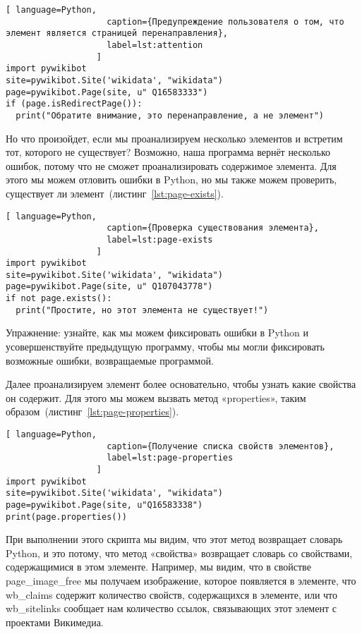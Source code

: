 \begin{lstlisting}[ language=Python,
                    caption={Предупреждение пользователя о том, что элемент является страницей перенаправления},
                    label=lst:attention
                  ]
import pywikibot
site=pywikibot.Site('wikidata', "wikidata")
page=pywikibot.Page(site, u" Q16583333")
if (page.isRedirectPage()):
  print("Обратите внимание, это перенаправление, а не элемент")
\end{lstlisting}

Но что произойдет, если мы проанализируем несколько элементов и встретим тот, которого не существует? Возможно, наша программа вернёт несколько ошибок, потому что не сможет проанализировать содержимое элемента. Для этого мы можем отловить ошибки в Python, но мы также можем проверить, существует ли элемент~(листинг~\ref{lst:page-exists}).

\begin{lstlisting}[ language=Python,
                    caption={Проверка существования элемента},
                    label=lst:page-exists
                  ]
import pywikibot
site=pywikibot.Site('wikidata', "wikidata")
page=pywikibot.Page(site, u" Q107043778")
if not page.exists():
  print("Простите, но этот элемента не существует!")
\end{lstlisting}

Упражнение: узнайте, как мы можем фиксировать ошибки в Python и усовершенствуйте предыдущую программу, чтобы мы могли фиксировать возможные ошибки, возвращаемые программой.

Далее проанализируем элемент более основательно, чтобы узнать какие свойства он содержит. Для этого мы можем вызвать метод «properties», таким образом~(листинг~\ref{lst:page-properties}).

\begin{lstlisting}[ language=Python,
                    caption={Получение списка свойств элементов},
                    label=lst:page-properties
                  ]
import pywikibot
site=pywikibot.Site('wikidata', "wikidata")
page=pywikibot.Page(site, u"Q16583338")
print(page.properties())
\end{lstlisting}

При выполнении этого скрипта мы видим, что этот метод возвращает словарь Python, и это потому, что метод «свойства» возвращает словарь со свойствами, содержащимися в этом элементе. Например, мы видим, что в свойстве page\_image\_free мы получаем изображение, которое появляется в элементе, что wb\_claims содержит количество свойств, содержащихся в элементе, или что wb\_sitelinks сообщает нам количество ссылок, связывающих этот элемент с проектами Викимедиа.


